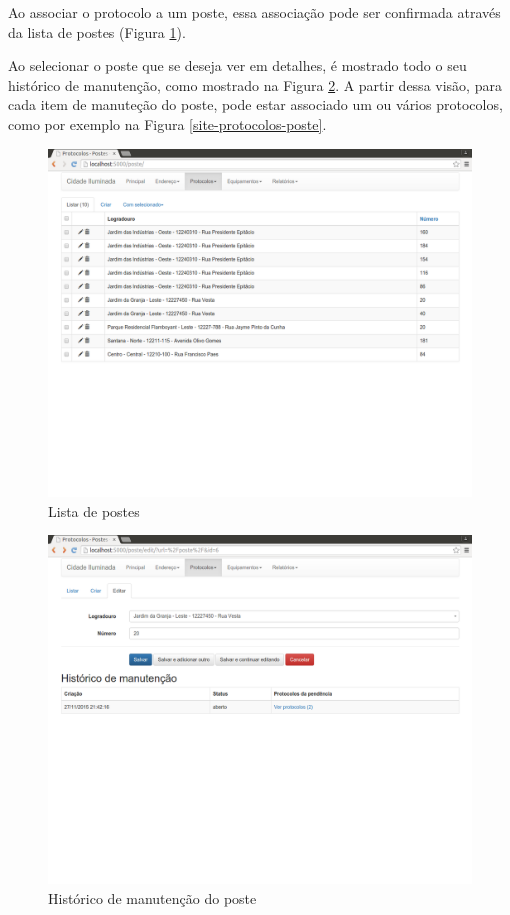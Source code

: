 \documentclass[
	article,			%
	11pt,				%
	oneside,			%
	a4paper,			%
	english,			%
	brazil,				%
	sumario=tradicional
	]{abntex2}
\begin{document}
\clearpage

Ao associar o protocolo a um poste, essa associação pode ser confirmada através da lista de postes (Figura \ref{site-lista-poste}).

Ao selecionar o poste que se deseja ver em detalhes, é mostrado todo o seu histórico de manutenção, como mostrado na Figura \ref{site-historico-manutencao}.
A partir dessa visão, para cada item de manuteção do poste, pode estar associado um ou vários protocolos, como por exemplo na Figura \ref{site-protocolos-poste}.

\begin{figure}[!htbp]
 \centering
 \caption{\label{site-lista-poste}Lista de postes}
 \includegraphics[scale=0.25]{site/4-lista_postes.png}
\end{figure}

\begin{figure}[!htbp]
 \centering
 \caption{\label{site-historico-manutencao}Histórico de manutenção do poste}
 \includegraphics[scale=0.25]{site/5-historico_manutencao_poste.png}
\end{figure}
\end{document}
